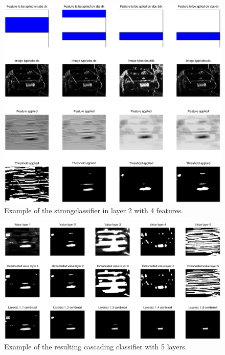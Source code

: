 \documentclass[a4paper,11pt]{article}
\begin{document}
\begin{figure}[!ht]
\centering
\includegraphics[width=17cm]{img/strongClassifier_layer2_img14}
\caption{Example of the strongclassifier in layer 2 with 4 features.}
\label{fig:strongclassify}
\end{figure}

\begin{figure}[!ht]
\centering
\includegraphics[width=16cm]{img/cascader_img14}
\caption{Example of the resulting cascading classifier with 5 layers.}
\label{fig:cascader}
\end{figure}
\end{document}
